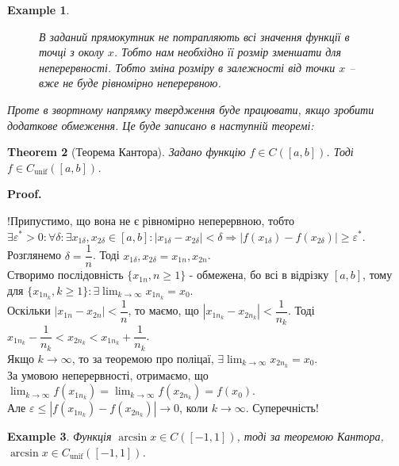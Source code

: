 \documentclass[a4paper, 14pt]{article}
\makeatletter
\def\qed{$\blacksquare$}
\theoremstyle{theoremdd}
\newtheorem{theorem}{Theorem}[subsection]
\theoremstyle{theoremdd}
\theoremstyle{theoremdd}
\theoremstyle{theoremdd}
\newtheorem{example}[theorem]{Example}
\theoremstyle{theoremdd}
\theoremstyle{theoremdd}
\theoremstyle{theoremdd}
\theoremstyle{theoremdd}
\renewenvironment{proof}[1][Proof.\\]{\par
\pushQED{\hfill \qed}%
\normalfont \topsep6\p@\@plus6\p@\relax
\trivlist
\item\relax
{\bfseries
#1\@addpunct{.}}\hspace\labelsep\ignorespaces
}{%
\popQED\endtrivlist\@endpefalse
}
\makeatother
\begin{document}
\begin{example}
\begin{figure}[H]
\caption*{В заданий прямокутник не потрапляють всі значення функції в точці з околу $x$. Тобто нам необхідно її розмір зменшати для неперервності. Тобто зміна розміру в залежності від точки $x$ -- вже не буде рівномірно неперервною.}
\end{figure}
\fi %

Проте в звортному напрямку твердження буде працювати, якщо зробити додаткове обмеження. Це буде записано в наступній теоремі:
\end{example}

\begin{theorem}[Теорема Кантора]
Задано функцію $f \in C([a,b])$. Тоді $f \in C_{\text{unif}}([a,b])$.
\end{theorem}

\begin{proof}
!Припустимо, що вона не є рівномірно неперервною, тобто\\
$\exists \varepsilon^* > 0: \forall \delta: \exists x_{1 \delta}, x_{2 \delta} \in [a,b]: |x_{1 \delta} - x_{2 \delta}| < \delta \Rightarrow |f(x_{1 \delta}) - f(x_{2 \delta})| \geq \varepsilon^*$.\\
Розглянемо $\delta = \dfrac{1}{n}$. Тоді $x_{1 \delta}, x_{2 \delta} = x_{1n}, x_{2n}$.\\
Створимо послідовність $\{x_{1n}, n \geq 1\}$ - обмежена, бо всі в відрізку $[a,b]$, тому для $\{x_{{1n}_k}, k \geq 1\}: \exists \displaystyle \lim_{k \to \infty} x_{{1n}_k} = x_0$.\\
Оскільки $|x_{1n} - x_{2n}| < \dfrac{1}{n}$, то маємо, що $|x_{1n_k} - x_{2n_k}| < \dfrac{1}{n_k}$. Тоді $x_{1n_k} - \dfrac{1}{n_k} < x_{2n_k} < x_{1n_k} + \dfrac{1}{n_k}$.\\
Якщо $k \to \infty$, то за теоремою про поліцаї, $\exists \displaystyle \lim_{k \to \infty} x_{2n_k} = x_0$.\\
За умовою неперервності, отримаємо, що $\displaystyle\lim_{k \to \infty} f(x_{1n_k}) = \lim_{k \to \infty} f(x_{2n_k}) = f(x_0)$.\\
Але $\varepsilon \leq |f(x_{1n_k}) - f(x_{2n_k})| \to 0$, коли $k \to \infty$. Суперечність!
\end{proof}

\begin{example}
Функція $\arcsin x \in C([-1,1])$, тоді за теоремою Кантора, $\arcsin x \in C_{\text{unif}}([-1,1])$.
\end{example}
\end{document}
